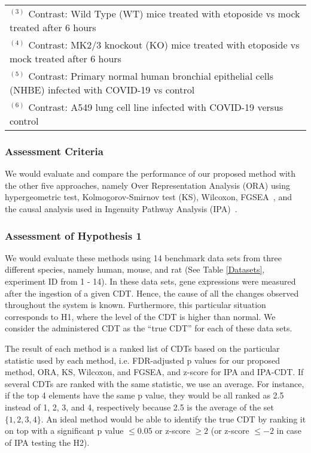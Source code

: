\begin{table}
\begin{center}
\begin{tabular}{ c|cccc }
 \multicolumn{5}{l}{\tiny $^{(3)}$ Contrast: Wild Type (WT) mice treated with etoposide vs mock treated after 6 hours}\\
 \multicolumn{5}{l}{\tiny $^{(4)}$ Contrast: MK2/3 knockout (KO) mice treated with etoposide vs mock treated after 6 hours}\\
 \multicolumn{5}{l}{\tiny $^{(5)}$ Contrast: Primary normal human bronchial epithelial cells (NHBE) infected with COVID-19 vs control}\\
 \multicolumn{5}{l}{\tiny $^{(6)}$ Contrast: A549 lung cell line infected with COVID-19 versus control}\\
\end{tabular}
\end{center}
\end{table}


\subsubsection{Assessment Criteria}


We would evaluate and compare the performance of our proposed method with the other five approaches, namely Over Representation Analysis (ORA) using hypergeometric test, Kolmogorov-Smirnov test (KS)\cite{massey1951kolmogorov}, Wilcoxon\cite{wilcoxon1945individual}, FGSEA~\cite{korotkevich2021fast}, and the causal analysis used in Ingenuity Pathway Analysis (IPA)~\cite{kramer2013causal}.



\subsubsection{Assessment of Hypothesis 1}
We would evaluate these methods using 14 benchmark data sets from three different species, namely human, mouse, and rat (See Table \ref{Datasets}, experiment ID from 1 - 14). 
In these data sets, gene expressions were measured after the ingestion of a given CDT.
Hence, the cause of all the changes observed  throughout the system is known. Furthermore, this particular situation corresponds to  H1, where the level of the CDT is higher than normal.
We consider the administered CDT as the ``true CDT'' for each of these data sets.

The result of each method is a ranked list of CDTs based on the particular statistic used by each method, i.e. FDR-adjusted p values for our proposed method, ORA, KS, Wilcoxon, and FGSEA, and  z-score  for IPA and IPA-CDT. 
If several CDTs are ranked with the same statistic, we use an average. For instance, if  the top 4 elements have the same p value, they would be all ranked as 2.5 instead of 1, 2, 3, and 4, respectively because 2.5 is the average of the set $\{1, 2, 3, 4\}$.
An ideal method would be able to identify the true CDT by ranking it on top with a significant p value $\leq 0.05$ or  z-score $\geq 2$ (or z-score $\leq -2$ in case of IPA testing the H2).

